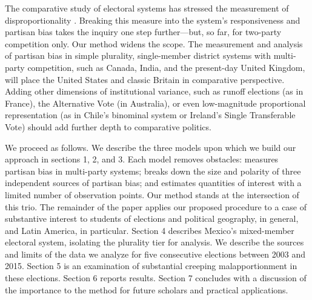 \documentclass[letter,12pt]{article}
\begin{document}
The comparative study of electoral systems has stressed the measurement of disproportionality \citep{lijphartElSysPtySys.1994}. Breaking this measure into the system's responsiveness and partisan bias takes the inquiry one step further---but, so far, for two-party competition only. Our method widens the scope. The measurement and analysis of partisan bias in simple plurality, single-member district systems with multi-party competition, such as Canada, India, and the present-day United Kingdom, will place the United States and classic Britain in comparative perspective. Adding other dimensions of institutional variance, such as runoff elections (as in France), the Alternative Vote (in Australia), or even low-magnitude proportional representation (as in Chile's binominal system or Ireland's Single Transferable Vote) should add further depth to comparative politics. 


We proceed as follows. We describe the three models upon which we build our approach in sections 1, 2, and 3. Each model removes obstacles: \citet{king.1990elRespBiasMultiparty} measures partisan bias in multi-party systems; \citet{grofman.etalBiasMalapp.1997} breaks down the size and polarity of three independent sources of partisan bias; and \citet{linzerSeatVoteElasticity2012} estimates quantities of interest with a limited number of observation points. Our method stands at the intersection of this trio. The remainder of the paper applies our proposed procedure to a case of substantive interest to students of elections and political geography, in general, and Latin America, in particular. Section 4 describes Mexico's mixed-member electoral system, isolating the plurality tier for analysis. We describe the sources and limits of the data we analyze for five consecutive elections between 2003 and 2015. Section 5 is an examination of substantial creeping malapportionment in these elections. Section 6 reports results. Section 7 concludes with a discussion of the importance to the method for future scholars and practical applications. 
\end{document}
